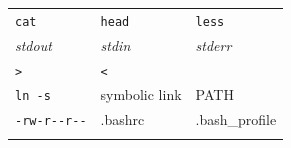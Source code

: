 \documentclass[]{krantz}
\begin{document}
\begin{longtable}[]{@{}lll@{}}
\begin{minipage}[t]{0.34\columnwidth}\raggedright
\texttt{cat}\strut
\end{minipage} & \begin{minipage}[t]{0.35\columnwidth}\raggedright
\texttt{head}\strut
\end{minipage} & \begin{minipage}[t]{0.22\columnwidth}\raggedright
\texttt{less}\strut
\end{minipage}\tabularnewline
\begin{minipage}[t]{0.34\columnwidth}\raggedright
\emph{stdout}\strut
\end{minipage} & \begin{minipage}[t]{0.35\columnwidth}\raggedright
\emph{stdin}\strut
\end{minipage} & \begin{minipage}[t]{0.22\columnwidth}\raggedright
\emph{stderr}\strut
\end{minipage}\tabularnewline
\begin{minipage}[t]{0.34\columnwidth}\raggedright
\texttt{\textgreater{}}\strut
\end{minipage} & \begin{minipage}[t]{0.35\columnwidth}\raggedright
\texttt{\textless{}}\strut
\end{minipage} & \begin{minipage}[t]{0.22\columnwidth}\raggedright
\texttt{\textbar{}}\strut
\end{minipage}\tabularnewline
\begin{minipage}[t]{0.34\columnwidth}\raggedright
\texttt{ln\ -s}\strut
\end{minipage} & \begin{minipage}[t]{0.35\columnwidth}\raggedright
symbolic link\strut
\end{minipage} & \begin{minipage}[t]{0.22\columnwidth}\raggedright
PATH\strut
\end{minipage}\tabularnewline
\begin{minipage}[t]{0.34\columnwidth}\raggedright
\texttt{-rw-r-\/-r-\/-}\strut
\end{minipage} & \begin{minipage}[t]{0.35\columnwidth}\raggedright
.bashrc\strut
\end{minipage} & \begin{minipage}[t]{0.22\columnwidth}\raggedright
.bash\_profile\strut
\end{minipage}\tabularnewline
\begin{minipage}[t]{0.34\columnwidth}\raggedright

\end{minipage}
\end{longtable}
\end{document}
